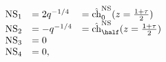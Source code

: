 \begin{equation} \label{NS-special}
  \begin{array}{lll}
{\rm NS}_1 &= 2 q^{-1/4} &= \hat{\rm ch}_0^{\rm NS}(z={1+\tau\over 2}) \\
{\rm NS}_2 &= -  q^{-1/4}&= \hat{\rm ch}_{\half}^{\rm NS}(z={1+\tau\over 2}) \\
{\rm NS}_3 &= 0&\\
{\rm NS}_4 &= 0,&    
  \end{array}
\end{equation}

